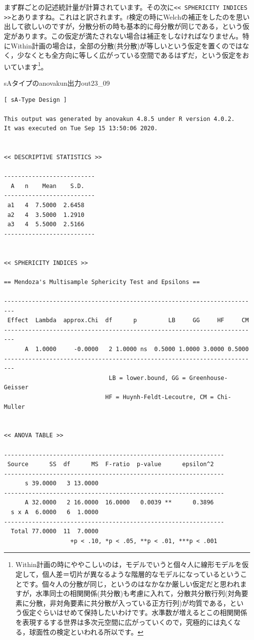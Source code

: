 \documentclass{ltjsarticle}
\begin{document}
まず群ごとの記述統計量が計算されています。その次に\verb|<< SPHERICITY INDICES >>|とありますね。これはと訳されます。$t$検定の時にWelchの補正をしたのを思い出して欲しいのですが，分散分析の時も基本的に母分散が同じである，という仮定があります。この仮定が満たされない場合は補正をしなければなりません。特にWithin計画の場合は，全部の分散(共分散)が等しいという仮定を置くのではなく，少なくとも全方向に等しく広がっている空間であるはずだ，という仮定をおいています\footnote{Within計画の時にややこしいのは，モデルでいうと個々人に線形モデルを仮定して，個人差＝切片が異なるような階層的なモデルになっているということです。個々人の分散が同じ，というのはなかなか厳しい仮定だと思われますが，水準同士の相関関係(共分散)も考慮に入れて，分散共分散行列(対角要素に分散，非対角要素に共分散が入っている正方行列)が均質である，という仮定ぐらいはせめて保持したいわけです。水準数が増えるとこの相関関係を表現するする世界は多次元空間に広がっていくので，究極的には丸くなる，球面性の検定といわれる所以です。 }。
\begin{Rscreen}{sAタイプのanovakun出力}{out23_09}
\begin{verbatim}
[ sA-Type Design ]

This output was generated by anovakun 4.8.5 under R version 4.0.2.
It was executed on Tue Sep 15 13:50:06 2020.

 
<< DESCRIPTIVE STATISTICS >>

--------------------------
  A   n    Mean    S.D. 
--------------------------
 a1   4  7.5000  2.6458 
 a2   4  3.5000  1.2910 
 a3   4  5.5000  2.5166 
--------------------------


<< SPHERICITY INDICES >>

== Mendoza's Multisample Sphericity Test and Epsilons ==

-------------------------------------------------------------------------
 Effect  Lambda  approx.Chi  df      p         LB     GG     HF     CM 
-------------------------------------------------------------------------
      A  1.0000     -0.0000   2 1.0000 ns  0.5000 1.0000 3.0000 0.5000 
-------------------------------------------------------------------------
                              LB = lower.bound, GG = Greenhouse-Geisser
                             HF = Huynh-Feldt-Lecoutre, CM = Chi-Muller


<< ANOVA TABLE >>

---------------------------------------------------------------
 Source      SS  df      MS  F-ratio  p-value      epsilon^2 
---------------------------------------------------------------
      s 39.0000   3 13.0000                                  
---------------------------------------------------------------
      A 32.0000   2 16.0000  16.0000   0.0039 **      0.3896 
  s x A  6.0000   6  1.0000                                  
---------------------------------------------------------------
  Total 77.0000  11  7.0000                                  
                   +p < .10, *p < .05, **p < .01, ***p < .001
\end{verbatim}
\end{Rscreen}
\end{document}
